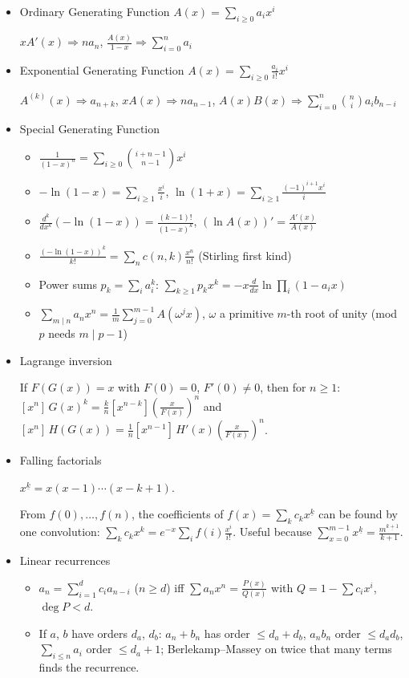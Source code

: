 \begin{itemize}
\item Ordinary Generating Function $A(x) = \sum_{i\ge 0} a_ix^i$

$xA'(x) \Rightarrow na_n$, \quad $\frac{A(x)}{1-x} \Rightarrow \sum_{i=0}^{n} a_i$
\item Exponential Generating Function $A(x) = \sum_{i\ge 0} \frac{a_i}{i!}x^i$

$A^{(k)}(x) \Rightarrow a_{n+k}$, \quad $xA(x) \Rightarrow na_{n-1}$, \quad $A(x)B(x) \Rightarrow \sum_{i=0}^{n} \binom{n}{i}a_ib_{n-i}$
\item Special Generating Function
\begin{itemize}
    \item $\frac{1}{(1-x)^n} = \sum_{i\ge 0} \binom{i+n-1}{n-1}x^i$
    \item $-\ln(1-x) = \sum_{i\ge 1} \frac{x^i}{i}$, \quad $\ln(1+x) = \sum_{i\ge 1} \frac{(-1)^{i+1}x^i}{i}$
    \item $\frac{d^k}{dx^k}\left(-\ln(1-x)\right) = \frac{(k-1)!}{(1-x)^k}$, \quad $(\ln A(x))' = \frac{A'(x)}{A(x)}$
    \item $\frac{(-\ln(1-x))^k}{k!} = \sum_{n} c(n, k)\frac{x^n}{n!}$ (Stirling first kind)
    \item Power sums $p_k = \sum_i a_i^k$: $\sum_{k\ge 1} p_k x^k = -x\frac{d}{dx}\ln\prod_i(1-a_ix)$
    \item $\sum_{m \mid n} a_nx^n = \frac{1}{m}\sum_{j=0}^{m-1} A(\omega^jx)$, $\omega$ a primitive $m$-th root of unity (mod $p$ needs $m \mid p - 1$)
\end{itemize}
\item Lagrange inversion

If $F(G(x)) = x$ with $F(0) = 0$, $F'(0) \ne 0$, then for $n \ge 1$: $[x^n]\, G(x)^k = \frac{k}{n} [x^{n-k}] \left(\frac{x}{F(x)}\right)^n$ and $[x^n]\, H(G(x)) = \frac 1 n [x^{n-1}]\, H'(x) \left(\frac{x}{F(x)}\right)^n$.
\item Falling factorials

$x^{\underline k} = x(x - 1) \cdots (x - k + 1)$.

From $f(0), \ldots, f(n)$, the coefficients of $f(x) = \sum_k c_k x^{\underline k}$ can be found by one convolution: $\sum_k c_k x^k = e^{-x} \sum_i f(i) \frac{x^i}{i!}$. Useful because $\sum_{x=0}^{m-1} x^{\underline k} = \frac{m^{\underline{k+1}}}{k+1}$.
\item Linear recurrences

\begin{itemize}
  \item $a_n = \sum_{i=1}^{d} c_i a_{n-i}$ ($n \ge d$) iff $\sum a_n x^n = \frac{P(x)}{Q(x)}$ with $Q = 1 - \sum c_i x^i$, $\deg P < d$.
  \item If $a$, $b$ have orders $d_a$, $d_b$: $a_n + b_n$ has order $\le d_a + d_b$, $a_n b_n$ order $\le d_a d_b$, $\sum_{i \le n} a_i$ order $\le d_a + 1$; Berlekamp–Massey on twice that many terms finds the recurrence.
\end{itemize}
\end{itemize}
